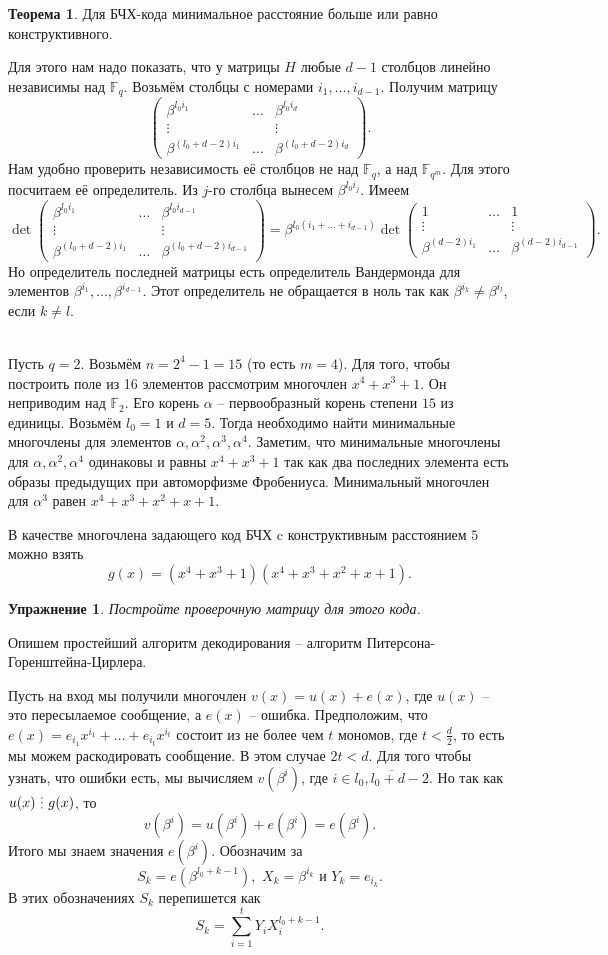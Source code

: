 \documentclass[10pt,a4paper,oneside]{book}
\newtheorem{upr}{Упражнение}
\theoremstyle{definition}
\newtheorem{thm}{{\color{red!40!black} Теорема}}
\newcommand{\mb}[1]{\mathbb{#1}}
\newcommand{\ovl}{\overline}
\newcommand{\di}{\mathop{\,\scalebox{0.85}{\raisebox{-1.2pt}[0.5\height]{\vdots}}\,}}
\def\thrm{\begin{thm}}
\def\ethrm{\end{thm}}
\def\pmat{\begin{pmatrix}}
\def\epmat{\end{pmatrix}}
\def\bupr{\begin{upr}}
\def\eupr{\end{upr}}
\begin{document}
\thrm Для БЧХ-кода минимальное расстояние больше или равно конструктивного.
\ethrm
\proof
Для этого нам надо показать, что у матрицы $H$ любые $d-1$ столбцов линейно независимы над $\mb F_q$. Возьмём столбцы с номерами $i_1,\dots,i_{d-1}$. Получим матрицу 
$$ \pmat 
\beta^{l_0 i_1}& \dots &\beta^{l_0 i_d}\\
\vdots & & \vdots\\
\beta^{(l_0+d-2)i_1} & \dots & \beta^{(l_0+d-2)i_d} 
\epmat.$$
Нам удобно проверить независимость её столбцов не над $\mb F_q$, а над $\mb F_{q^m}$. Для этого посчитаем её определитель. Из $j$-го столбца вынесем $\beta^{l_0i_j}$. Имеем
$$ \det \pmat 
\beta^{l_0 i_1}& \dots &\beta^{l_0 i_{d-1}}\\
\vdots & & \vdots\\
\beta^{(l_0+d-2)i_1} & \dots & \beta^{(l_0+d-2)i_{d-1}} 
\epmat = \beta^{l_0(i_1+\dots+i_{d-1})} \det  \pmat 
1& \dots &1\\
\vdots & & \vdots\\
\beta^{(d-2)i_1} & \dots & \beta^{(d-2)i_{d-1}} 
\epmat.$$
Но определитель последней матрицы есть определитель Вандермонда для элементов $\beta^{i_1}, \dots, \beta^{i_{d-1}}$. Этот определитель не обращается в ноль так как $\beta^{i_k}\neq \beta^{i_l}$, если $k\neq l$.


\endproof

\\
Пусть $q=2$. Возьмём $n=2^4-1=15$ (то есть $m=4$). Для того, чтобы построить поле из 16 элементов рассмотрим многочлен $x^4+x^3+1$. Он неприводим над $\mb F_2$. Его корень $\alpha$ -- первообразный корень степени $15$ из единицы. Возьмём $l_0=1$ и $d=5$. Тогда необходимо найти минимальные многочлены для элементов $\alpha,\alpha^2,\alpha^3,\alpha^4$. Заметим, что минимальные многочлены для $\alpha,\alpha^2,\alpha^4$ одинаковы и равны $x^4+x^3+1$ так как два последних элемента есть образы предыдущих при автоморфизме Фробениуса. Минимальный многочлен для $\alpha^3$ равен $x^4+x^3+x^2+x+1$. 

В качестве многочлена задающего код БЧХ c конструктивным расстоянием $5$ можно взять $$g(x)=(x^4+x^3+1)(x^4+x^3+x^2+x+1).$$

\bupr Постройте проверочную матрицу для этого кода.
\eupr

Опишем простейший алгоритм декодирования -- алгоритм Питерсона-Горенштейна-Цирлера.

Пусть на вход мы получили многочлен $v(x)=u(x)+e(x)$, где $u(x)$ -- это пересылаемое сообщение, а $e(x)$ -- ошибка. Предположим, что $e(x)=e_{i_1}x^{i_1}+\dots +e_{i_t}x^{i_t}$ состоит из не более чем $t$ мономов, где $t<\frac{d}{2}$, то есть мы можем раскодировать сообщение. В этом случае $2t<d$. Для того чтобы узнать, что ошибки есть, мы вычисляем $v(\beta^{i})$, где $i\in \ovl{l_0, l_0+d-2}$. Но так как $u(x) \di g(x)$, то
$$v(\beta^{i})=u(\beta^{i})+e(\beta^{i})=e(\beta^{i}).$$
Итого мы знаем значения $e(\beta^{i})$. Обозначим за $$S_k= e(\beta^{l_0+k-1}), \,\, X_k=\beta^{i_k} \text{ и } Y_k=e_{i_k}.$$
В этих обозначениях $S_k$ перепишется как 
$$S_k=\sum_{i=1}^t Y_i X_i^{l_0+k-1}.$$
\end{document}
